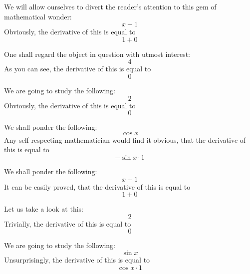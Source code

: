 \documentclass{article}
\begin{document}
We will allow ourselves to divert the reader's attention to this gem of mathematical wonder:
\begin{equation}
x + 1 
\end{equation}
Obviously, the derivative of this is equal to
\begin{equation}
1 + 0 
\end{equation}

One shall regard the object in question with utmost interest:
\begin{equation}
4 
\end{equation}
As you can see, the derivative of this is equal to
\begin{equation}
0 
\end{equation}

We are going to study the following:
\begin{equation}
2 
\end{equation}
Obviously, the derivative of this is equal to
\begin{equation}
0 
\end{equation}

We shall ponder the following:
\begin{equation}
\cos x 
\end{equation}
Any self-respecting mathematician would find it obvious, that the derivative of this is equal to
\begin{equation}
-\sin x \cdot 1 
\end{equation}

We shall ponder the following:
\begin{equation}
x + 1 
\end{equation}
It can be easily proved, that the derivative of this is equal to
\begin{equation}
1 + 0 
\end{equation}

Let us take a look at this:
\begin{equation}
2 
\end{equation}
Trivially, the derivative of this is equal to
\begin{equation}
0 
\end{equation}

We are going to study the following:
\begin{equation}
\sin x 
\end{equation}
Unsurprisingly, the derivative of this is equal to
\begin{equation}
\cos x \cdot 1 
\end{equation}
\end{document}
